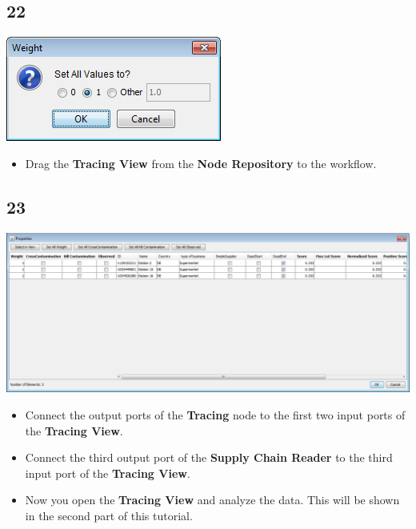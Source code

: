 \documentclass{beamer}
\begin{document}
\subsection{22}
\begin{frame}
	\begin{center}
  		\includegraphics[height=0.6\textheight]{22.png}
	\end{center}
	\begin{itemize}
		\item Drag the \textbf{Tracing View} from the \textbf{Node Repository} to the workflow.
	\end{itemize}
\end{frame}

\subsection{23}
\begin{frame}
	\begin{center}
  		\includegraphics[height=0.6\textheight]{23.png}
	\end{center}
	\begin{itemize}
		\item Connect the output ports of the \textbf{Tracing} node to the first two input ports of the \textbf{Tracing View}.
		\item Connect the third output port of the \textbf{Supply Chain Reader} to the third input port of the \textbf{Tracing View}.
		\item Now you open the \textbf{Tracing View} and analyze the data. This will be shown in the second part of this tutorial.
	\end{itemize}
\end{frame}
\end{document}
